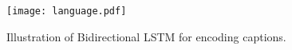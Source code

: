\documentclass[10pt,twocolumn,letterpaper]{article}
\begin{document}
	\begin{figure}[h]
		\begin{center}
			\texttt{[image: language.pdf]}
		\end{center}
		\caption{Illustration of Bidirectional LSTM for encoding captions.}
		\label{fig:lan}
	\end{figure}
	
	
\end{document}
